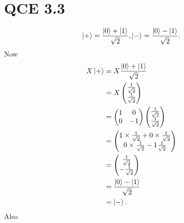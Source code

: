 \documentclass[10pt]{article}
\begin{document}
\section*{QCE 3.3}
\begin{align*}
\ket{+} = \frac{\ket{0} + \ket{1}}{\sqrt{2}}, \ket{-} = \frac{\ket{0} - \ket{1}}{\sqrt{2}}.
\end{align*}
Now
\begin{align*}
X \ket{+} &= X \frac{\ket{0} + \ket{1}}{\sqrt{2}} \\
               &= X \begin{pmatrix}
               \frac{1}{\sqrt{2}} \\
               \frac{1}{\sqrt{2}}
               \end{pmatrix} \\
               &= \begin{pmatrix}
               1 & 0 \\
               0 & - 1 
               \end{pmatrix} \begin{pmatrix}
               \frac{1}{\sqrt{2}} \\
               \frac{1}{\sqrt{2}}
               \end{pmatrix} \\
               & = \begin{pmatrix}
               1 \times \frac{1}{\sqrt{2}} + 0 \times \frac{1}{\sqrt{2}} \\
               0 \times \frac{1}{\sqrt{2}} - 1 \frac{1}{\sqrt{2}}
               \end{pmatrix} \\
                &= \begin{pmatrix}
               \frac{1}{\sqrt{2}} \\
               - \frac{1}{\sqrt{2}}
               \end{pmatrix} \\
               &= \frac{\ket{0} - \ket{1}}{\sqrt{2}} \\
               &= \ket{-}.
\end{align*}
Also 
\end{document}
